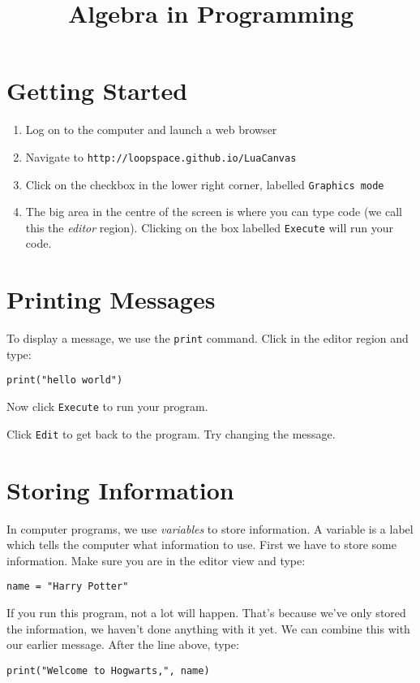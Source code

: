 \documentclass[
  xhtml,%
  text
]{internet}
\title{Algebra in Programming}
\begin{document}
\section*{Getting Started}

\begin{enumerate}
\item Log on to the computer and launch a web browser
\item Navigate to \texttt{http://loopspace.github.io/LuaCanvas}
\item Click on the checkbox in the lower right corner, labelled \texttt{Graphics mode}
\item The big area in the centre of the screen is where you can type code (we call this the \emph{editor} region).
Clicking on the box labelled \texttt{Execute} will run your code.
\end{enumerate}

\section*{Printing Messages}

To display a message, we use the \texttt{print} command.
Click in the editor region and type:

\begin{verbatim}
print("hello world")
\end{verbatim}

Now click \texttt{Execute} to run your program.

Click \texttt{Edit} to get back to the program.
Try changing the message.

\section*{Storing Information}

In computer programs, we use \emph{variables} to store information.
A variable is a label which tells the computer what information to use.
First we have to store some information.
Make sure you are in the editor view and type:

\begin{verbatim}
name = "Harry Potter"
\end{verbatim}

If you run this program, not a lot will happen.
That's because we've only stored the information, we haven't done anything with it yet.
We can combine this with our earlier message.
After the line above, type:

\begin{verbatim}
print("Welcome to Hogwarts,", name)
\end{verbatim}
\end{document}
